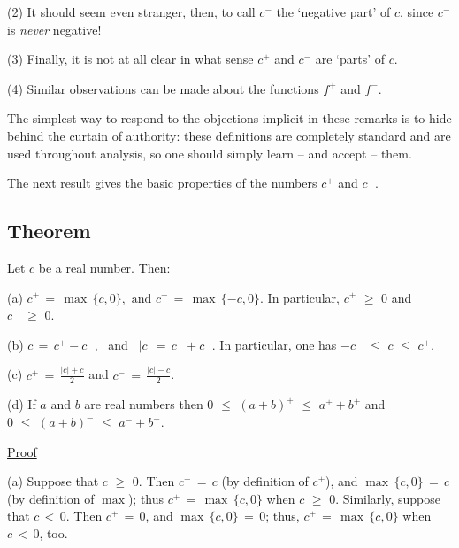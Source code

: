 {\V

        (2) It should seem even stranger, then, to call $c^{-}$ the `negative part' of $c$, since $c^{-}$ is {\em never} negative!

\V

        (3) Finally, it is not at all clear in what sense $c^{+}$ and $c^{-}$ are `parts' of $c$.

\V

        (4) Similar observations can be made about the functions $f^{+}$ and $f^{-}$.

\V

        The simplest way to respond to the objections implicit in these remarks is to hide behind the curtain of authority:
    these definitions are completely standard and are used throughout analysis, so one should simply learn -- and accept -- them.

\V
\V

        The next result gives the basic properties of the numbers $c^{+}$ and $c^{-}$.

\V

            \subsection{\small{\bf Theorem}}
            \label{ThmB20.100}

        Let $c$ be a real number. Then:

\V

        (a) $c^{+} \,=\, {\max}\,\{c,0\}, \mbox{ and } c^{-} \,=\, {\max}\,\{-c,0\}$.
    In particular, $c^{+}\,\,{\geq}\,\,0$ and $c^{-}\,\,{\geq}\,\,0$.

\V

        (b) $c \,=\, c^{+} - c^{-}$, \mbox{ and } $|c| \,=\, c^{+} + c^{-}$.
    In particular, one has  $-c^{-}\,\,{\leq}\,\,c\,\,{\leq}\,\,c^{+}$.


\V

        (c) ${\displaystyle c^{+} \,=\, \frac{|c|+c}{2}}$
    and ${\displaystyle c^{-} \,=\, \frac{|c|-c}{2}}$.

\V

        (d) If $a$ and $b$ are real numbers then $0\,\,{\leq}\,\,(a+b)^{+}\,\,{\leq}\,\,a^{+}+b^{+}$ and $0\,\,{\leq}\,\,(a+b)^{-}\,\,{\leq}\,\,a^{-}+b^{-}$.

\V

        \underline{Proof}

\V

        (a) Suppose that $c\,\,{\geq}\,\,0$. Then $c^{+} \,=\, c$ (by definition of $c^{+}$), and ${\max}\,\{c,0\} \,=\, c$ (by definition of $\max$);
    thus $c^{+} \,=\, \max\,\{c,0\}$ when $c\,\,{\geq}\,\,0$.
    Similarly, suppose that $c\,<\,0$. Then $c^{+} \,=\, 0$, and  ${\max}\,\{c,0\} \,=\, 0$; thus, $c^{+} \,=\, \max\,\{c,0\}$ when $c\,<\,0$, too.

}
